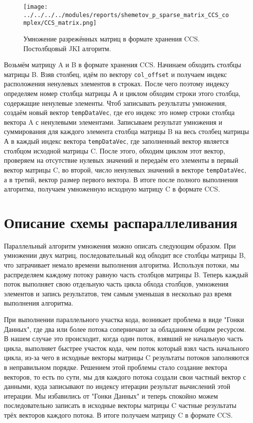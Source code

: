 \documentclass{report}
\begin{document}
	
	
	\begin{figure}[htbp]
		\texttt{[image: ../../../../modules/reports/shemetov\_p\_sparse\_matrix\_CCS\_complex/CCS\_matrix.png]}
		\caption{Умножение разрежённых матриц в формате хранения CCS. Постолбцовый JKI алгоритм.}
	\end{figure}
	
	
	Возьмём матрицу A и B в формате хранения CCS. Начинаем обходить столбцы матрицы B. Взяв столбец, идём по вектору \verb|col_offset| и получаем индекс расположения ненулевых элементов в строках. После чего поэтому индексу определяем номер столбца матрицы А и циклом обходим строки этого столбца, содержащие ненулевые элементы. Чтоб записывать результаты умножения, создаём новый вектор \verb|tempDataVec|, где его индекс это номер строки столбца вектора A с ненулевыми элементами. Записываем результат умножения и суммирования для каждого элемента столбца матрицы B на весь столбец матрицы А в каждый индекс вектора \verb|tempDataVec|, где заполненный вектор является столбцом исходной матрицы C. После этого, обходим циклом этот вектор, проверяем на отсутствие нулевых значений и передаём его элементы в первый вектор матрицы C, во второй, число ненулевых значений в векторе \verb|tempDataVec|, а в третий, вектор размер первого вектора. В итоге после полного выполнения алгоритма, получаем умноженную исходную матрицу C в формате CCS.
	\newpage
	
	\section*{Описание схемы распараллеливания}
	Параллельный алгоритм умножения можно описать следующим образом. При умножении двух матриц, последовательный код обходит все столбцы матрицы B, что затрачивает немало времени выполнения алгоритма. Используя потоки, мы распределяем каждому потоку равную часть столбцов матрицы B. Теперь каждый поток выполняет свою отдельную часть цикла обхода столбцов, умножения элементов и запись результатов, тем самым уменьшая в несколько раз время выполнения алгоритма. 
	\par При выполнении параллельного участка кода, возникает проблема в виде "Гонки Данных"{}, где два или более потока соперничают за обладанием общим ресурсом. В нашем случае это происходит, когда один поток, взявший не начальную часть цикла, выполняет быстрее участок кода, чем поток который взял часть начального цикла, из-за чего в исходные векторы матрицы C результаты потоков заполняются в неправильном порядке. Решением этой проблемы стало создание вектора векторов, то есть по сути, мы для каждого потока создали свои частный вектор с данными, куда записывают по индексу итерации результат вычислений этой итерации. Мы избавились от "Гонки Данных" и теперь спокойно можем последовательно записать в исходные векторы матрицы C частные результаты трёх векторов каждого потока. В итоге получаем матрицу C в формате CCS.
	\newpage
	
\end{document}
